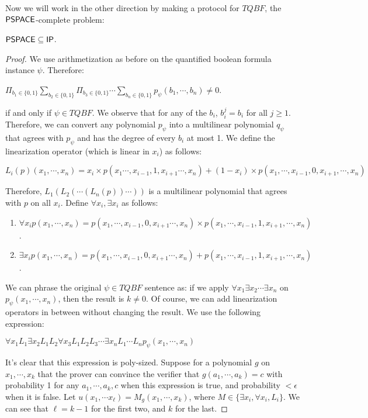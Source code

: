 Now we will work in the other direction by making a protocol for $TQBF$, the ${\mathsf{PSPACE}}$-complete problem:
\begin{theorem}
${\mathsf{PSPACE}} \subseteq {\ensuremath{\mathsf{IP}}}$.
\end{theorem}
\begin{proof}
We use arithmetization as before on the quantified boolean formula instance $\psi$. Therefore:
\begin{center}
$\Pi_{b_1 \in \{0, 1\}} \sum_{b_2 \in \{0, 1\}} \Pi_{b_3 \in \{0, 1\}} \cdots \sum_{b_n \in \{0, 1\}} p_{\psi}(b_1, \cdots, b_n) \ne 0$.
\end{center}
if and only if $\psi \in TQBF$. We observe that for any of the $b_i$, $b_i^j = b_i$ for all $j \ge 1$. Therefore, we can convert any polynomial $p_{\psi}$ into a multilinear polynomial $q_{\psi}$ that agrees with $p_{\psi}$ and has the degree of every $b_i$ at most 1. We define the linearization operator (which is linear in $x_i$) as follows:
\begin{center}
$L_i(p)(x_1, \cdots, x_n) = x_i \times p(x_1 \cdots, x_{i-1}, 1, x_{i+1}\cdots, x_n) + (1-x_i)\times p(x_1, \cdots, x_{i-1}, 0, x_{i+1}, \cdots, x_n)$
\end{center}
Therefore, $L_1(L_2(\cdots(L_n(p))\cdots))$ is a multilinear polynomial that agrees with $p$ on all $x_i$. Define $\forall x_i, \exists x_i$ as follows:
\begin{enumerate}
\item $\forall x_i p(x_1, \cdots, x_n) = p(x_1, \cdots, x_{i-1}, 0, x_{i+1}\cdots, x_n) \times p(x_1, \cdots, x_{i-1}, 1, x_{i+1}, \cdots, x_n)$.
\item $\exists x_i p(x_1, \cdots, x_n) = p(x_1, \cdots, x_{i-1}, 0, x_{i+1}\cdots, x_n) + p(x_1, \cdots, x_{i-1}, 1, x_{i+1}, \cdots, x_n)$.
\end{enumerate}
We can phrase the original $\psi \in TQBF$ sentence as: if we apply $\forall x_1 \exists x_2 \cdots \exists x_n$ on $p_{\psi}(x_1, \cdots, x_n)$, then the result is $k \ne 0$. Of course, we can add linearization operators in between without changing the result. We use the following expression:
\begin{center}
$\forall x_1 L_1 \exists x_2 L_1 L_2 \forall x_3 L_1 L_2 L_3 \cdots \exists x_n L_1 \cdots L_n p_{\psi}(x_1, \cdots, x_n)$
\end{center}
It's clear that this expression is poly-sized. Suppose for a polynomial $g$ on $x_1, \cdots, x_k$ that the prover can convince the verifier that $g(a_1, \cdots, a_k) = c$ with probability 1 for any $a_1, \cdots, a_k, c$ when this expression is true, and probability $< \epsilon$ when it is false. Let $u(x_1, \cdots x_{\ell}) = M_g(x_1, \cdots, x_k)$, where $M \in \{\exists x_i, \forall x_i, L_{i}\}$. We can see that $\ell = k-1$ for the first two, and $k$ for the last. 


\end{proof}
